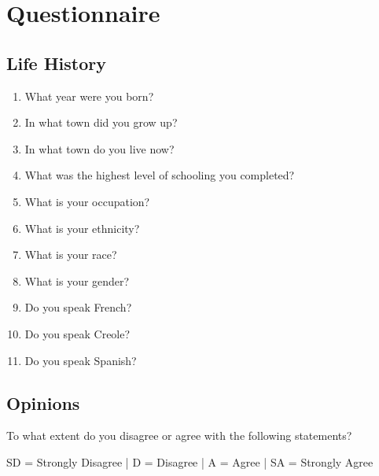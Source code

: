 

\section{Questionnaire}
  \subsection{Life History}
    \begin{enumerate}
      \item What year were you born? \hrulefill
      \item In what town did you grow up? \hrulefill
      \item In what town do you live now? \hrulefill
      \item What was the highest level of schooling you completed? \hrulefill
      \item What is your occupation? \hrulefill
      \item What is your ethnicity? \hrulefill
      \item What is your race? \hrulefill
      \item What is your gender? \hrulefill
      \item Do you speak French? \hrulefill
      \item Do you speak Creole? \hrulefill
      \item Do you speak Spanish? \hrulefill
    \end{enumerate}

  \subsection{Opinions}
    \noindent To what extent do you disagree or agree with the following statements?

    \noindent SD = Strongly Disagree | D = Disagree | A = Agree | SA = Strongly Agree

